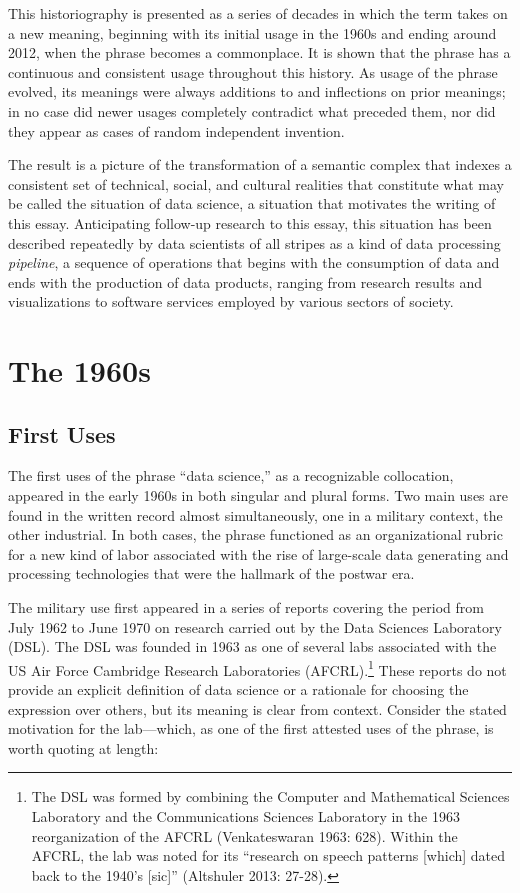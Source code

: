 \documentclass[
  letterpaper,
]{report}
\begin{document}
This historiography is presented as a series of decades in which the
term takes on a new meaning, beginning with its initial usage in the
1960s and ending around 2012, when the phrase becomes a commonplace. It
is shown that the phrase has a continuous and consistent usage
throughout this history. As usage of the phrase evolved, its meanings
were always additions to and inflections on prior meanings; in no case
did newer usages completely contradict what preceded them, nor did they
appear as cases of random independent invention.

The result is a picture of the transformation of a semantic complex that
indexes a consistent set of technical, social, and cultural realities
that constitute what may be called the situation of data science, a
situation that motivates the writing of this essay. Anticipating
follow-up research to this essay, this situation has been described
repeatedly by data scientists of all stripes as a kind of data
processing \emph{pipeline}, a sequence of operations that begins with
the consumption of data and ends with the production of data products,
ranging from research results and visualizations to software services
employed by various sectors of society.

\hypertarget{the-1960s}{%
\chapter{The 1960s}\label{the-1960s}}

\hypertarget{first-uses}{%
\section{First Uses}\label{first-uses}}

The first uses of the phrase ``data science,'' as a recognizable
collocation, appeared in the early 1960s in both singular and plural
forms. Two main uses are found in the written record almost
simultaneously, one in a military context, the other industrial. In both
cases, the phrase functioned as an organizational rubric for a new kind
of labor associated with the rise of large-scale data generating and
processing technologies that were the hallmark of the postwar era.

The military use first appeared in a series of reports covering the
period from July 1962 to June 1970 on research carried out by the Data
Sciences Laboratory (DSL). The DSL was founded in 1963 as one of several
labs associated with the US Air Force Cambridge Research Laboratories
(AFCRL).\footnote{The DSL was formed by combining the Computer and
  Mathematical Sciences Laboratory and the Communications Sciences
  Laboratory in the 1963 reorganization of the AFCRL (Venkateswaran
  1963: 628). Within the AFCRL, the lab was noted for its ``research on
  speech patterns {[}which{]} dated back to the 1940's {[}sic{]}''
  (Altshuler 2013: 27-28).} These reports do not provide an explicit
definition of data science or a rationale for choosing the expression
over others, but its meaning is clear from context. Consider the stated
motivation for the lab---which, as one of the first attested uses of the
phrase, is worth quoting at length:
\end{document}
